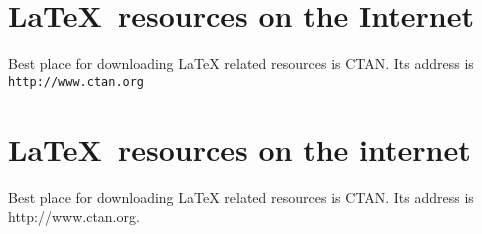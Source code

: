 \documentclass{article}
\begin{document}
	\section{\textsf{\LaTeX\ resources on the Internet}}
	Best place for downloading LaTeX related resources is CTAN.
	Its address is \texttt{http://www.ctan.org}
	
	\section{\sffamily\LaTeX\ resources on the internet}
	Best place for downloading LaTeX related resources is CTAN.
	Its address is \ttfamily http://www.ctan.org\rmfamily.
	
\end{document}
